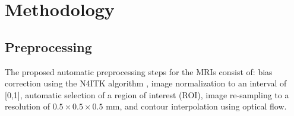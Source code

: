\section{Methodology}
\label{sec:methods}



\subsection{Preprocessing}
\label{subsec:prepro}
The proposed automatic preprocessing steps for the MRIs consist of: bias correction using the N4ITK algorithm \parencite{n4itk}, image normalization to an interval of [0,1], automatic selection of a region of interest (ROI), image re-sampling to a resolution of $0.5 \times 0.5 \times 0.5$ mm, and contour interpolation using optical flow.  

